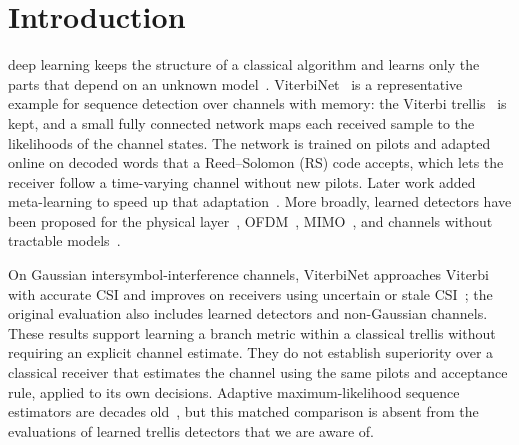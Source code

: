 \documentclass[journal]{IEEEtran}
\begin{document}
\section{Introduction}
 deep learning keeps the structure of a classical algorithm and learns only the parts that depend on an unknown model~\cite{shlezinger2023mbdl}. ViterbiNet~\cite{shlezinger2020viterbinet} is a representative example for sequence detection over channels with memory: the Viterbi trellis~\cite{forney1973viterbi,forney1972mlse} is kept, and a small fully connected network maps each received sample to the likelihoods of the channel states. The network is trained on pilots and adapted online on decoded words that a Reed--Solomon (RS) code accepts, which lets the receiver follow a time-varying channel without new pilots. Later work added meta-learning to speed up that adaptation~\cite{raviv2021metaviterbinet,raviv2023online}. More broadly, learned detectors have been proposed for the physical layer~\cite{oshea2017intro}, OFDM~\cite{ye2018power}, MIMO~\cite{samuel2019learning}, and channels without tractable models~\cite{farsad2018neural}.

On Gaussian intersymbol-interference channels, ViterbiNet approaches Viterbi with accurate CSI and improves on receivers using uncertain or stale CSI~\cite{shlezinger2020viterbinet}; the original evaluation also includes learned detectors and non-Gaussian channels. These results support learning a branch metric within a classical trellis without requiring an explicit channel estimate. They do not establish superiority over a classical receiver that estimates the channel using the same pilots and acceptance rule, applied to its own decisions. Adaptive maximum-likelihood sequence estimators are decades old~\cite{magee1973adaptive,raheli1995psp}, but this matched comparison is absent from the evaluations of learned trellis detectors that we are aware of.
\end{document}
